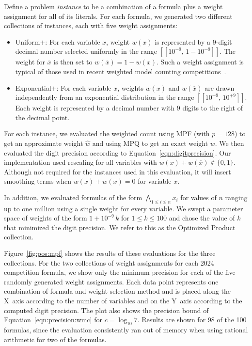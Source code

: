 \documentclass[letterpaper,USenglish,cleveref, autoref, thm-restate]{lipics-v2021}
\newcommand{\obar}[1]{\overline{#1}}
\newcommand{\approximate}[1]{\hat{#1}}
\newcommand{\approxw}{\approximate{w}}
\newcommand{\interval}[1]{[\![#1]\!]}
\begin{document}
Define a problem \emph{instance} to be a combination of a formula
plus a weight assignment for all of its literals.
For each formula, we generated two different collections of instances, each with five weight assignments:
\begin{itemize}
\item \textsf{Uniform$+$}: For each variable $x$, weight $w(x)$ is represented by a 9-digit decimal number selected uniformly in the range
  $\interval{10^{-9},\,1-10^{-9}}$. The weight for $\obar{x}$ is then set to
  $w(\obar{x}) = 1-w(x)$.  Such a weight assignment is typical of those used in recent weighted model counting competitions~\cite{fichte:jea:2020}.
\item \textsf{Exponential$+$}: For each variable $x$, weights $w(x)$ and $w(\obar{x})$
  are drawn independently from an exponential distribution in the range
  $\interval{10^{-9},\,10^{+9}}$.  Each weight is represented by a decimal number with 9 digits to the right of the decimal point.
\end{itemize}


For each instance, we evaluated
the weighted count using MPF (with $p=128$) to get an approximate weight $\approxw$ and
using MPQ to get an exact weight $w$.  We then evaluated the digit precision according to Equation~\ref{eqn:digitprecision}.   Our implementation used rescaling for all variables
with $w(x) + w(\obar{x}) \not \in \{0, 1\}$.
Although not required for the instances used in this evaluation,
it will insert smoothing terms when $w(x) + w(\obar{x}) = 0$ for variable $x$.

In addition, we evaluated formulas of the form $\bigwedge_{1\leq i
  \leq n} x_i$ for values of $n$ ranging up to one million using a
single weight for every variable.  We swept a parameter space of
weights of the form $1 + 10^{-9}\,k$ for $1 \leq k \leq 100$ and
chose the value of $k$ that minimized the digit precision.  We refer
to this as the \textsf{Optimized Product} collection.

Figure~\ref{fig:pos:mpf} shows the results of these evaluations for
the three collections.  For the two collections of weight assignments for each 2024 competition formula,
we show only the minimum precision for each of the five randomly
generated  weight assignments.  Each data point
represents one combination of formula and weight selection method and is placed
along the X~axis according to the number of variables
and on the Y~axis according to the computed digit precision.
The plot also shows the precision bound of Equation~\ref{eqn:precision:wmc} for $c=\log_{10} 7$.
Results are shown for 98 of the 100 formulas, since the evaluation consistently ran out of memory when using rational arithmetic for two of the formulas.
\end{document}
